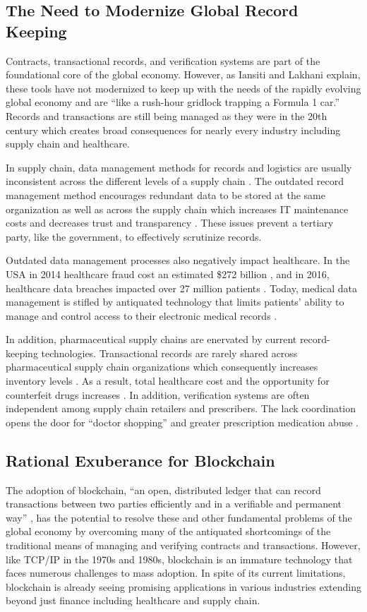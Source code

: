 \documentclass[sigconf]{acmart}
\begin{document}
\subsection{The Need to Modernize Global Record Keeping}
Contracts, transactional records, and verification systems are part of the foundational core of the global economy. However, as Iansiti and Lakhani \cite{hbr} explain, these tools have not modernized to keep up with the needs of the rapidly evolving global economy and are ``like a rush-hour gridlock trapping a Formula 1 car.'' Records and transactions are still being managed as they were in the 20th century which creates broad consequences for nearly every industry including supply chain and healthcare.

In supply chain, data management methods for records and logistics are usually inconsistent across the different levels of a supply chain \cite{arbc4}. The outdated record management method encourages redundant data to be stored at the same organization as well as across the supply chain which increases IT maintenance costs and decreases trust and transparency \cite{arbc1}. These issues prevent a tertiary party, like the government, to effectively scrutinize records. 

Outdated data management processes also negatively impact healthcare. In the USA in 2014 healthcare fraud cost an estimated \$272 billion \cite{economist2014}, and in 2016, healthcare data breaches impacted over 27 million patients \cite{das2017}. Today, medical data management is stifled by antiquated technology that limits patients' ability to manage and control access to their electronic medical records \cite{ekblaw2016medrec}.

In addition, pharmaceutical supply chains are enervated by current record-keeping technologies. Transactional records are rarely shared across pharmaceutical supply chain organizations which consequently increases inventory levels \cite{Nematollahi01}. As a result, total healthcare cost and the opportunity for counterfeit drugs increases \cite{Sahay01}. In addition, verification systems are often independent among supply chain retailers and prescribers. The lack coordination opens the door for ``doctor shopping'' and greater prescription medication abuse \cite{hitchingHealthcare}. 

\subsection{Rational Exuberance for Blockchain}
The adoption of blockchain, ``an open, distributed ledger that can record transactions between two parties efficiently and in a verifiable and permanent way'' \cite{hbr}, has the potential to resolve these and other fundamental problems of the global economy by overcoming many of the antiquated shortcomings of the traditional means of managing and verifying contracts and transactions. However, like TCP/IP in the 1970s and 1980s, blockchain is an immature technology that faces numerous challenges to mass adoption. In spite of its current limitations, blockchain is already seeing promising applications in various industries extending beyond just finance including healthcare and supply chain.
\end{document}
